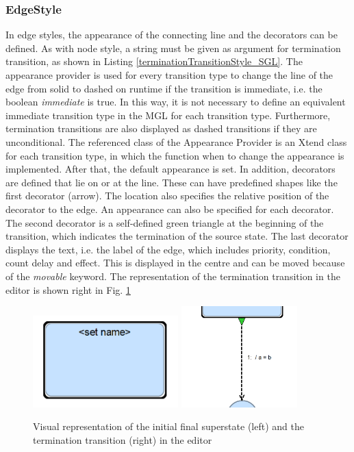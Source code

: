 \subsubsection{EdgeStyle}
In edge styles, the appearance of the connecting line and the decorators can be defined. As with node style, a string must be given as argument for termination transition, as shown in Listing \ref{terminationTransitionStyle_SGL}. The appearance provider is used for every transition type to change the line of the edge from solid to dashed on runtime if the transition is immediate, i.e. the boolean \textit{immediate} is true. In this way, it is not necessary to define an equivalent immediate transition type in the MGL for each transition type. Furthermore, termination transitions are also displayed as dashed transitions if they are unconditional. The referenced class of the Appearance Provider is an Xtend class for each transition type, in which the function when to change the appearance is implemented. After that, the default appearance is set. In addition, decorators are defined that lie on or at the line. These can have predefined shapes like the first decorator (arrow). The location also specifies the relative position of the decorator to the edge. An appearance can also be specified for each decorator. The second decorator is a self-defined green triangle at the beginning of the transition, which indicates the termination of the source state. The last decorator displays the text, i.e. the label of the edge, which includes priority, condition, count delay and effect. This is displayed in the centre and can be moved because of the \textit{movable} keyword. The representation of the termination transition in the editor is shown right in Fig. \ref{fig:SGL_Elements}


\begin{figure}[h!]
\centering
\includegraphics[width=0.5\textwidth]{bilder/SGL_InitFinSuper_Shape.png}
\includegraphics[width=0.4\textwidth]{bilder/SGL_TermTran_Shape.png}
\caption{Visual representation of the initial final superstate (left) and the termination transition (right) in the editor}
\label{fig:SGL_Elements}
\end{figure} 

